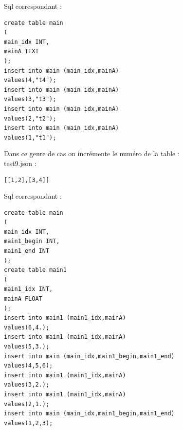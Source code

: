 \documentclass{report}
\begin{document}
Sql correspondant :
\\
\begin{verbatim}
create table main                                                                                                                                                      
(                                                                                                                                                                      
main_idx INT,                                                                                                                                                          
mainA TEXT                                                                                                                                                             
);                                                                                                                                                                     
insert into main (main_idx,mainA)                                                                                                                                      
values(4,"t4");                                                                                                                                                        
insert into main (main_idx,mainA)
values(3,"t3");
insert into main (main_idx,mainA)
values(2,"t2");
insert into main (main_idx,mainA)
values(1,"t1");
\end{verbatim}

Dans ce genre de cas on incrémente le numéro de la table :\\
test9.json :
\\
\begin{verbatim}
[[1,2],[3,4]]
\end{verbatim}

Sql correspondant :
\\
\begin{verbatim}
create table main
(
main_idx INT,
main1_begin INT,
main1_end INT
);
create table main1
(
main1_idx INT,
mainA FLOAT
);
insert into main1 (main1_idx,mainA)
values(6,4.);
insert into main1 (main1_idx,mainA)
values(5,3.);
insert into main (main_idx,main1_begin,main1_end)
values(4,5,6);
insert into main1 (main1_idx,mainA)
values(3,2.);
insert into main1 (main1_idx,mainA)
values(2,1.);
insert into main (main_idx,main1_begin,main1_end)
values(1,2,3);
\end{verbatim}
\end{document}
